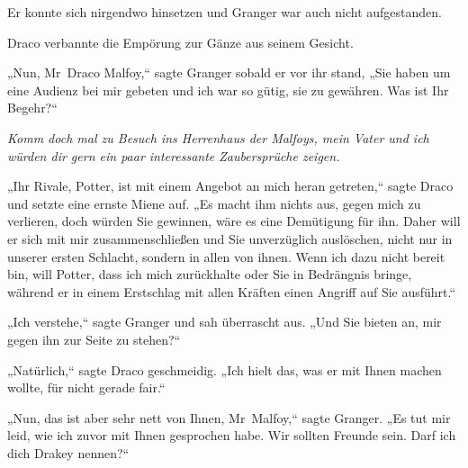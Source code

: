 Er konnte sich nirgendwo hinsetzen und Granger war auch nicht aufgestanden.

Draco verbannte die Empörung zur Gänze aus seinem Gesicht.

„Nun, Mr~Draco Malfoy,“ sagte Granger sobald er vor ihr stand, „Sie haben um eine Audienz bei mir gebeten und ich war so gütig, sie zu gewähren. Was ist Ihr Begehr?“

\emph{Komm doch mal zu Besuch ins Herrenhaus der Malfoys, mein Vater und ich würden dir gern ein paar interessante Zaubersprüche zeigen.}

„Ihr Rivale, Potter, ist mit einem Angebot an mich heran getreten,“ sagte Draco und setzte eine ernste Miene auf. „Es macht ihm nichts aus, gegen mich zu verlieren, doch würden Sie gewinnen, wäre es eine Demütigung für ihn. Daher will er sich mit mir zusammenschließen und Sie unverzüglich auslöschen, nicht nur in unserer ersten Schlacht, sondern in allen von ihnen. Wenn ich dazu nicht bereit bin, will Potter, dass ich mich zurückhalte oder Sie in Bedrängnis bringe, während er in einem Erstschlag mit allen Kräften einen Angriff auf Sie ausführt.“

„Ich verstehe,“ sagte Granger und sah überrascht aus. „Und Sie bieten an, mir gegen ihn zur Seite zu stehen?“

„Natürlich,“ sagte Draco geschmeidig. „Ich hielt das, was er mit Ihnen machen wollte, für nicht gerade fair.“

„Nun, das ist aber sehr nett von Ihnen, Mr~Malfoy,“ sagte Granger. „Es tut mir leid, wie ich zuvor mit Ihnen gesprochen habe. Wir sollten Freunde sein. Darf ich dich Drakey nennen?“

